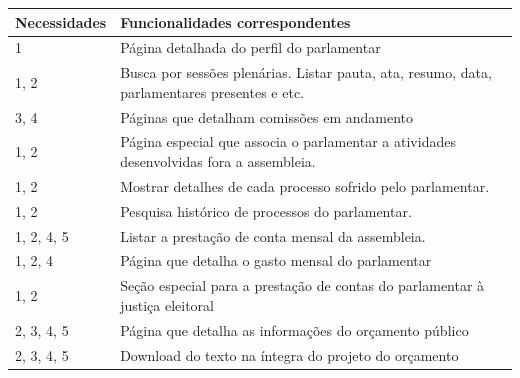\documentclass[12pt, a4paper]{article}
\begin{document}
            \begin{longtabu}{X[-1, r]| X}
                \hline
                \textbf{Necessidades} &
                \textbf{Funcionalidades correspondentes}
                \\ \hline

                1 &
                Página detalhada do perfil do parlamentar
                \\ \hline

                1, 2 &
                Busca por sessões plenárias. Listar pauta, ata, resumo, data,
                parlamentares presentes e etc.
                \\ \hline

                3, 4 &
                Páginas que detalham comissões em andamento
                \\ \hline

                1, 2 &
                Página especial que associa o parlamentar a atividades
                desenvolvidas fora a assembleia.
                \\ \hline

                1, 2 &
                Mostrar detalhes de cada processo sofrido pelo parlamentar.
                \\ \hline

                1, 2 &
                Pesquisa histórico de processos do parlamentar.
                \\ \hline

                1, 2, 4, 5 &
                Listar a prestação de conta mensal da assembleia.
                \\ \hline

                1, 2, 4 &
                Página que detalha o gasto mensal do parlamentar
                \\ \hline

                1, 2 &
                Seção especial para a prestação de contas do parlamentar à
                justiça eleitoral
                \\ \hline

                2, 3, 4, 5 &
                Página que detalha as informações do orçamento público
                \\ \hline

                2, 3, 4, 5 &
                Download do texto na íntegra do projeto do orçamento
                \\ \hline


\end{longtabu}
\end{document}
